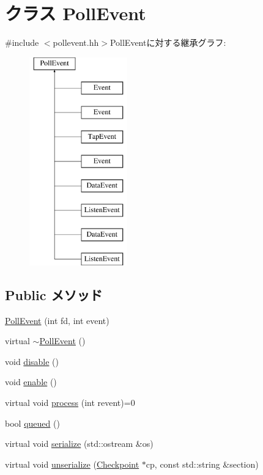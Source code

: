 \hypertarget{classPollEvent}{
\section{クラス PollEvent}
\label{classPollEvent}
}


{\ttfamily \#include $<$pollevent.hh$>$}PollEventに対する継承グラフ:\begin{figure}[H]
\begin{center}
\leavevmode
\includegraphics[height=9cm]{classPollEvent}
\end{center}
\end{figure}
\subsection*{Public メソッド}
\begin{DoxyCompactItemize}
\item 
\hyperlink{classPollEvent_aee8ae64a16b532669d397d37557c4948}{PollEvent} (int fd, int event)
\item 
virtual \hyperlink{classPollEvent_a98273ac625d58f5f80808cf543a4dc18}{$\sim$PollEvent} ()
\item 
void \hyperlink{classPollEvent_a8cfbbe53c1cf6e3054736daea3044c0f}{disable} ()
\item 
void \hyperlink{classPollEvent_a486f22824bd83c5308a0d70ffac6f758}{enable} ()
\item 
virtual void \hyperlink{classPollEvent_a8b870dc0eeb339499d64aa56fc0e2aa5}{process} (int revent)=0
\item 
bool \hyperlink{classPollEvent_afeaa51bebb848d5f58994a57dcf2a1c6}{queued} ()
\item 
virtual void \hyperlink{classPollEvent_ad6272f80ae37e8331e3969b3f072a801}{serialize} (std::ostream \&os)
\item 
virtual void \hyperlink{classPollEvent_af22e5d6d660b97db37003ac61ac4ee49}{unserialize} (\hyperlink{classCheckpoint}{Checkpoint} $\ast$cp, const std::string \&section)
\end{DoxyCompactItemize}
